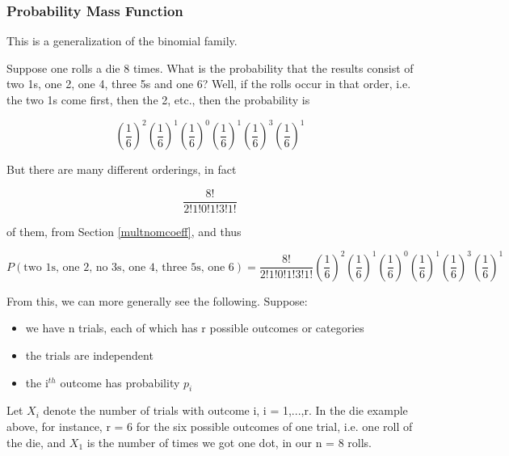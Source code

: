 \subsubsection{Probability Mass Function}
\label{multinompmfsection}

This is a generalization of the binomial family.

Suppose one rolls a die 8 times.  What is the probability that the
results consist of two 1s, one 2, one 4, three 5s and one 6?  Well, if
the rolls occur in that order, i.e. the two 1s come first, then the 2,
etc., then the probability is 

\begin{equation}
\left (\frac{1}{6} \right )^2
\left (\frac{1}{6} \right )^1
\left (\frac{1}{6} \right )^0
\left (\frac{1}{6} \right )^1
\left (\frac{1}{6} \right )^3
\left (\frac{1}{6} \right )^1
\end{equation}

But there are many different orderings, in fact

\begin{equation}
\frac{8!}{2!1!0!1!3!1!}
\end{equation}

of them, from Section \ref{multnomcoeff}, and thus 

\begin{equation}
P(\textrm{two 1s, one 2, no 3s, one 4, three 5s, one 6}) =
\frac{8!}{2!1!0!1!3!1!}
\left (\frac{1}{6} \right )^2
\left (\frac{1}{6} \right )^1
\left (\frac{1}{6} \right )^0
\left (\frac{1}{6} \right )^1
\left (\frac{1}{6} \right )^3
\left (\frac{1}{6} \right )^1
\end{equation}

From this, we can more generally see the following.  Suppose:

\begin{itemize}

\item we have n trials, each of which has r possible
outcomes or categories

\item the trials are independent

\item the i$^{th}$ outcome has probability $p_i$

\end{itemize}

Let $X_i$ denote the number of trials with outcome i, i = 1,...,r.  In
the die example above, for instance, r = 6 for the six possible outcomes
of one trial, i.e. one roll of the die, and $X_1$ is the number of times
we got one dot, in our n = 8 rolls.

